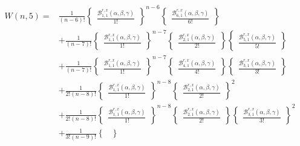 \documentclass[12pt]{amsart}
\newtheorem{proof 1}{proof 1}
\begin{document}
\begin{align*}
	W(n,5)=&\frac{1}{(n-6)!}\begin{Bmatrix}
		\frac{\mathcal{B}^{r,x}_{1,1}(\alpha,\beta,\gamma)}{1!}
	\end{Bmatrix}^{n-6}\begin{Bmatrix}
		\frac{\mathcal{B}^{r,x}_{6,1}(\alpha,\beta,\gamma)}{6!}
	\end{Bmatrix}\\&+\frac{1}{(n-7)!}\begin{Bmatrix}
		\frac{\mathcal{B}^{r,x}_{1,1}(\alpha,\beta,\gamma)}{1!}
	\end{Bmatrix}^{n-7}\begin{Bmatrix}
		\frac{\mathcal{B}^{r,x}_{2,1}(\alpha,\beta,\gamma)}{2!}
	\end{Bmatrix}\begin{Bmatrix}
		\frac{\mathcal{B}^{r,x}_{5,1}(\alpha,\beta,\gamma)}{5!}
	\end{Bmatrix}\\&+\frac{1}{(n-7)!}\begin{Bmatrix}
		\frac{\mathcal{B}^{r,x}_{1,1}(\alpha,\beta,\gamma)}{1!}
	\end{Bmatrix}^{n-7}\begin{Bmatrix}
		\frac{\mathcal{B}^{r,x}_{4,1}(\alpha,\beta,\gamma)}{4!}
	\end{Bmatrix}\begin{Bmatrix}
		\frac{\mathcal{B}^{r,x}_{3,1}(\alpha,\beta,\gamma)}{3!}
	\end{Bmatrix}\\&+\frac{1}{2!(n-8)!}\begin{Bmatrix}
		\frac{\mathcal{B}^{r,x}_{1,1}(\alpha,\beta,\gamma)}{1!}
	\end{Bmatrix}^{n-8}\begin{Bmatrix}
		\frac{\mathcal{B}^{r,x}_{2,1}(\alpha,\beta,\gamma)}{2!}
	\end{Bmatrix}^2\\&+
	\frac{1}{2!(n-8)!}\begin{Bmatrix}
		\frac{\mathcal{B}^{r,x}_{1,1}(\alpha,\beta,\gamma)}{1!}
	\end{Bmatrix}^{n-8}\begin{Bmatrix}
		\frac{\mathcal{B}^{r,x}_{2,1}(\alpha,\beta,\gamma)}{2!}
	\end{Bmatrix}\begin{Bmatrix}
		\frac{\mathcal{B}^{r,x}_{3,1}(\alpha,\beta,\gamma)}{3!}
	\end{Bmatrix}^2\\&+
	\frac{1}{3!(n-9)!}\begin{Bmatrix}

\end{Bmatrix}
\end{align*}
\end{document}
